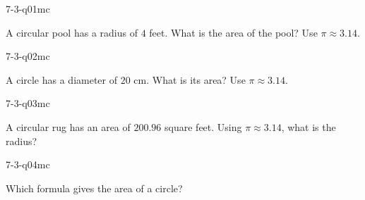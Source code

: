 

\begin{practiceQuestion}{7-3-q01}{mc}
\begin{questionText}
A circular pool has a radius of $4$ feet. What is the area of the pool? Use $\pi \approx 3.14$.
\end{questionText}
\end{practiceQuestion}

\begin{practiceQuestion}{7-3-q02}{mc}
\begin{questionText}
A circle has a diameter of $20$ cm. What is its area? Use $\pi \approx 3.14$.
\end{questionText}
\end{practiceQuestion}

\begin{practiceQuestion}{7-3-q03}{mc}
\begin{questionText}
A circular rug has an area of $200.96$ square feet. Using $\pi \approx 3.14$, what is the radius?
\end{questionText}
\end{practiceQuestion}

\begin{practiceQuestion}{7-3-q04}{mc}
\begin{questionText}
Which formula gives the area of a circle?
\end{questionText}
\end{practiceQuestion}

